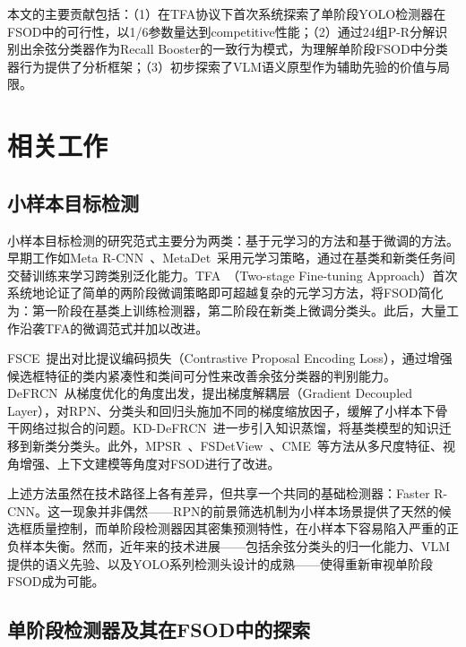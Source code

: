 \documentclass[zihao=5,a4paper,twocolumn]{ctexart}
\begin{document}
本文的主要贡献包括：（1）在TFA协议下首次系统探索了单阶段YOLO检测器在FSOD中的可行性，以1/6参数量达到competitive性能；（2）通过24组P-R分解识别出余弦分类器作为Recall Booster的一致行为模式，为理解单阶段FSOD中分类器行为提供了分析框架；（3）初步探索了VLM语义原型作为辅助先验的价值与局限。


\section{相关工作}

\subsection{小样本目标检测}

小样本目标检测的研究范式主要分为两类：基于元学习的方法和基于微调的方法。早期工作如Meta R-CNN~\cite{yan2019meta}、MetaDet~\cite{wang2019meta}采用元学习策略，通过在基类和新类任务间交替训练来学习跨类别泛化能力。TFA~\cite{wang2020tfa}（Two-stage Fine-tuning Approach）首次系统地论证了简单的两阶段微调策略即可超越复杂的元学习方法，将FSOD简化为：第一阶段在基类上训练检测器，第二阶段在新类上微调分类头。此后，大量工作沿袭TFA的微调范式并加以改进。

FSCE~\cite{sun2021fsce}提出对比提议编码损失（Contrastive Proposal Encoding Loss），通过增强候选框特征的类内紧凑性和类间可分性来改善余弦分类器的判别能力。DeFRCN~\cite{qiao2021defrcn}从梯度优化的角度出发，提出梯度解耦层（Gradient Decoupled Layer），对RPN、分类头和回归头施加不同的梯度缩放因子，缓解了小样本下骨干网络过拟合的问题。KD-DeFRCN~\cite{pei2022kddefrcn}进一步引入知识蒸馏，将基类模型的知识迁移到新类分类头。此外，MPSR~\cite{wu2020mpsr}、FSDetView~\cite{xiao2020fsdetview}、CME~\cite{li2021cme}等方法从多尺度特征、视角增强、上下文建模等角度对FSOD进行了改进。

上述方法虽然在技术路径上各有差异，但共享一个共同的基础检测器：Faster R-CNN。这一现象并非偶然——RPN的前景筛选机制为小样本场景提供了天然的候选框质量控制，而单阶段检测器因其密集预测特性，在小样本下容易陷入严重的正负样本失衡。然而，近年来的技术进展——包括余弦分类头的归一化能力、VLM提供的语义先验、以及YOLO系列检测头设计的成熟——使得重新审视单阶段FSOD成为可能。

\subsection{单阶段检测器及其在FSOD中的探索}
\end{document}
